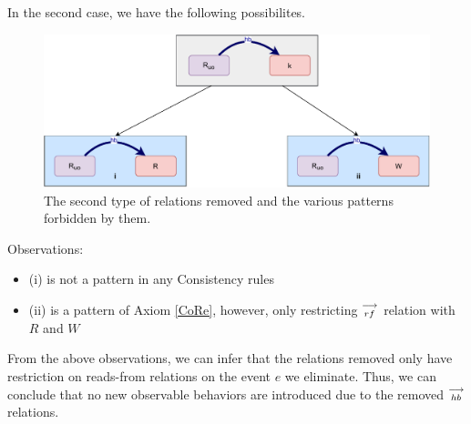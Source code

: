         In the second case, we have the following possibilites.
        \begin{figure}[H]
            \centering
            \includegraphics[scale=0.5]{Elimination/1.ValidEliminationCandidate/ReadElimProof/ProofParts/Part4_Case2.pdf}
            \caption{The second type of relations removed and the various patterns forbidden by them.}
        \end{figure}

        Observations:
        \begin{itemize}
            \item (i) is not a pattern in any Consistency rules
            \item (ii) is a pattern of Axiom \ref{CoRe}, however, only restricting $\stackrel{\longrightarrow}{_{rf}}$ relation with $R$ and $W$
        \end{itemize}

        From the above observations, we can infer that the relations removed only have restriction on reads-from relations on the event $e$ we eliminate. Thus, we can conclude that no new observable behaviors are introduced due to the removed $\stackrel{\longrightarrow}{_{hb}}$ relations. 